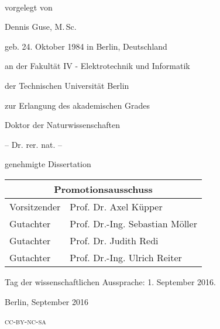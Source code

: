 \begin{titlepage}
    \begin{addmargin}[-1cm]{-3cm}
    \begin{center}
        \large  

        \hfill

        \vfill

        \vspace{3cm}

        \begingroup
            \color{Maroon}\spacedallcaps{\myTitle} \\ \bigskip
        \endgroup

        \vspace{1.6cm}	
				vorgelegt von
				
				\vspace{0.7cm}	
				Dennis Guse, M.\,Sc. 
				
				geb. 24. Oktober 1984 in Berlin, Deutschland



				\vspace{0.7cm}
				an der Fakultät IV - Elektrotechnik und Informatik
				
				der Technischen Universität Berlin
				
				zur Erlangung des akademischen Grades

				\vspace{0.7cm}
				Doktor der Naturwissenschaften
				
				-- Dr. rer. nat. --

				\vspace{0.7cm}
				genehmigte Dissertation
				\vspace{1.4cm}
				
				\centering
				\large
				\begin{tabular}{ll}
				\multicolumn{2}{c}{Promotionsausschuss} \\
				\hline				
				Vorsitzender  & Prof. Dr. Axel Küpper  \\
				Gutachter	& Prof. Dr.-Ing. Sebastian Möller \\
				Gutachter	& Prof. Dr. Judith Redi \\
				Gutachter	& Prof. Dr.-Ing. Ulrich Reiter \\
				\end{tabular}
			
				\vspace{0.7cm}
				Tag der wissenschaftlichen Aussprache: 1. September 2016.



				\vspace{1.4cm}
				Berlin, September 2016

				\vspace{0.7cm}	
				\textsc{\MakeLowercase{CC-BY-NC-SA}}

        \vfill                      

    \end{center}  
  \end{addmargin}       
\end{titlepage}   
